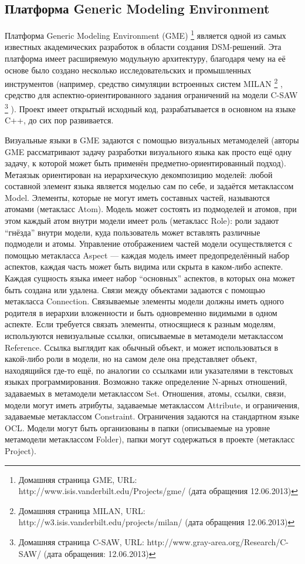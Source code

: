 \subsection{Платформа Generic Modeling Environment}
Платформа Generic Modeling Environment (GME)
\footnote{Домашняя страница GME, URL: http://www.isis.vanderbilt.edu/Projects/gme/ (дата обращения 12.06.2013)}
\cite{ledeczi2001generic} является одной из самых известных академических разработок в области создания DSM-решений. 
Эта платформа имеет расширяемую модульную архитектуру, благодаря чему на её основе было создано 
несколько исследовательских и промышленных инструментов (например, средство симуляции встроенных систем MILAN
\footnote{Домашняя страница MILAN, URL: http://w3.isis.vanderbilt.edu/projects/milan/ (дата обращения 12.06.2013)}
, средство для аспектно-ориентированного задания ограничений на модели C-SAW
\footnote{Домашняя страница C-SAW, URL: http://www.gray-area.org/Research/C-SAW/ (дата обращения: 12.06.2013)}
). Проект имеет открытый исходный код, разрабатывается в основном на языке C++, до сих пор развивается.

Визуальные языки в GME задаются с помощью визуальных метамоделей (авторы GME рассматривают 
задачу разработки визуального языка как просто ещё одну задачу, к которой может быть 
применён предметно-ориентированный подход). Метаязык ориентирован на иерархическую 
декомпозицию моделей: любой составной элемент языка является моделью сам по себе, и 
задаётся метаклассом Model. Элементы, которые не могут иметь составных частей, называются 
атомами (метакласс Atom). Модель может состоять из подмоделей и атомов, при этом каждый 
атом внутри модели имеет роль (метакласс Role): роли задают "`гнёзда"' внутри модели, 
куда пользователь может вставлять различные подмодели и атомы. Управление отображением 
частей модели осуществляется с помощью метакласса Aspect --- каждая модель имеет предопределённый 
набор аспектов, каждая часть может быть видима или скрыта в каком-либо аспекте. Каждая 
сущность языка имеет набор "`основных"' аспектов, в которых она может быть создана 
или удалена. Связи между объектами задаются с помощью метакласса Connection. Связываемые 
элементы модели должны иметь одного родителя в иерархии вложенности и быть одновременно 
видимыми в одном аспекте. Если требуется связать элементы, относящиеся к разным моделям, 
используются невизуальные ссылки, описываемые в метамодели метаклассом Reference. Ссылка 
выглядит как обычный объект, и может использоваться в какой-либо роли в модели, но на 
самом деле она представляет объект, находящийся где-то ещё, по аналогии со ссылками 
или указателями в текстовых языках программирования. Возможно также определение N-арных 
отношений, задаваемых в метамодели метаклассом Set. Отношения, атомы, ссылки, связи, 
модели могут иметь атрибуты, задаваемые метаклассом Attribute, и ограничения, задаваемые 
метаклассом Constraint. Ограничения задаются на стандартном языке OCL. Модели могут 
быть организованы в папки (описываемые на уровне метамодели метаклассом Folder), папки 
могут содержаться в проекте (метакласс Project).

